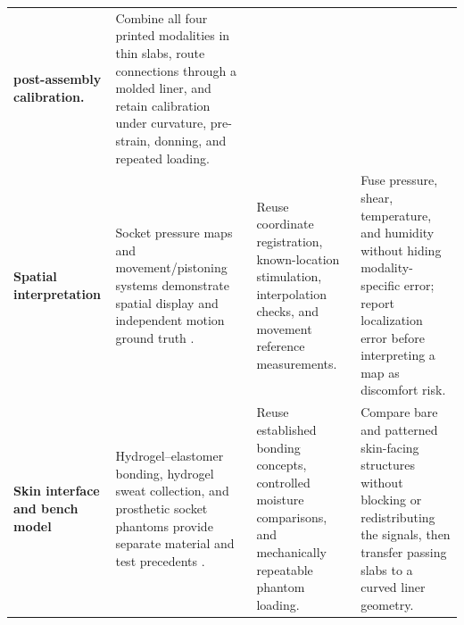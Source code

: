 \begin{tabularx}{\linewidth}{>{\raggedright\arraybackslash\bfseries\color{AUBRed}}p{2.45cm}Y Y Y}
post-assembly calibration. & Combine all four printed modalities in thin slabs,
route connections through a molded liner, and retain calibration under
curvature, pre-strain, donning, and repeated loading. \\
Spatial interpretation & Socket pressure maps and movement/pistoning systems
demonstrate spatial display and independent motion ground truth
\cite{q3turner2021,q3yu2024,noll2018}. & Reuse coordinate registration,
known-location stimulation, interpolation checks, and movement reference
measurements. & Fuse pressure, shear, temperature, and humidity without hiding
modality-specific error; report localization error before interpreting a map as
discomfort risk. \\
Skin interface and bench model & Hydrogel--elastomer bonding, hydrogel sweat
collection, and prosthetic socket phantoms provide separate material and test
precedents \cite{yuk2016,lu2025,quinlan2020,phillips2025}. & Reuse established
bonding concepts, controlled moisture comparisons, and mechanically repeatable
phantom loading. & Compare bare and patterned skin-facing structures without
blocking or redistributing the signals, then transfer passing slabs to a curved
liner geometry. \\
\end{tabularx}
\endgroup
{}

\vspace{0.5em}


